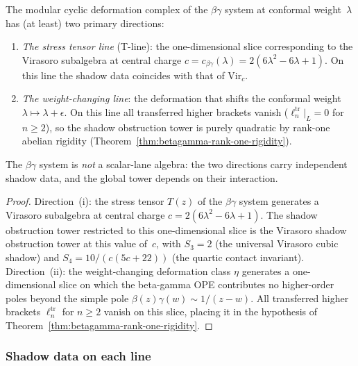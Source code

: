 \begin{proposition}
\label{prop:betagamma-deformation-channels}
The modular cyclic deformation complex of the $\beta\gamma$ system at
conformal weight~$\lambda$ has (at least) two primary directions:
\begin{enumerate}[label=\textup{(\roman*)}]
\item \emph{The stress tensor line}
 (T-line): the one-dimensional slice corresponding to
 the Virasoro subalgebra at central charge
 $c = c_{\beta\gamma}(\lambda) = 2(6\lambda^2 - 6\lambda + 1)$.
 On this line the shadow data coincides with that of
 $\mathrm{Vir}_{c}$.
\item \emph{The weight-changing line}: the deformation that shifts the
 conformal weight $\lambda \mapsto \lambda + \epsilon$. On this line
 all transferred higher brackets vanish
 ($\ell_n^{\mathrm{tr}}|_{L} = 0$ for $n \geq 2$),
 so the shadow obstruction tower is purely quadratic by rank-one abelian rigidity
 (Theorem~\textup{\ref{thm:betagamma-rank-one-rigidity}}).
\end{enumerate}
The $\beta\gamma$ system is \emph{not} a scalar-lane algebra:
the two directions carry independent shadow data, and the
global tower depends on their interaction.
\end{proposition}

\begin{proof}
Direction~(i): the stress tensor $T(z)$ of the $\beta\gamma$ system
generates a Virasoro subalgebra at central charge
$c = 2(6\lambda^2 - 6\lambda + 1)$. The shadow obstruction tower restricted to
this one-dimensional slice is the Virasoro shadow obstruction tower at this value
of~$c$, with $S_3 = 2$ (the universal Virasoro cubic shadow) and
$S_4 = 10/(c(5c+22))$ (the quartic contact invariant). Direction~(ii):
the weight-changing deformation class $\eta$ generates a one-dimensional
slice on which the beta-gamma OPE contributes no higher-order poles
beyond the simple pole $\beta(z)\gamma(w) \sim 1/(z{-}w)$. All
transferred higher brackets $\ell_n^{\mathrm{tr}}$ for $n \geq 2$
vanish on this slice, placing it in the hypothesis of
Theorem~\ref{thm:betagamma-rank-one-rigidity}.\qedhere
\end{proof}

\subsubsection{Shadow data on each line}

